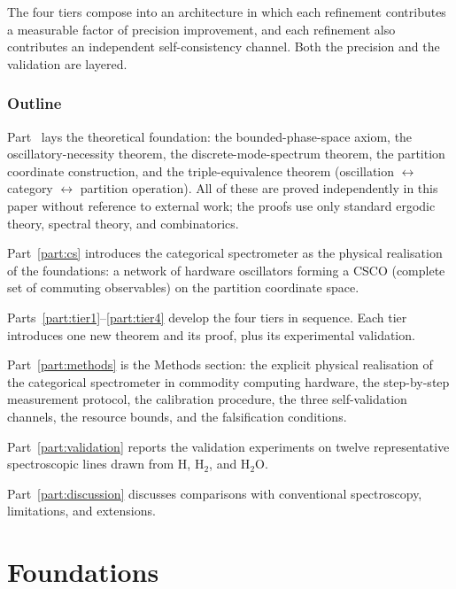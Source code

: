 \documentclass[twocolumn,11pt,a4paper]{article}
\theoremstyle{thmstyle}
\theoremstyle{axiomstyle}
\theoremstyle{definition}
\theoremstyle{remark}
\begin{document}
The four tiers compose into an architecture in which each refinement contributes a measurable factor of precision improvement, and each refinement also contributes an independent self-consistency channel. Both the precision and the validation are layered.

\section{Outline}
\label{sec:outline}

Part~\ref{part:foundations} lays the theoretical foundation: the bounded-phase-space axiom, the oscillatory-necessity theorem, the discrete-mode-spectrum theorem, the partition coordinate construction, and the triple-equivalence theorem (oscillation $\leftrightarrow$ category $\leftrightarrow$ partition operation). All of these are proved independently in this paper without reference to external work; the proofs use only standard ergodic theory, spectral theory, and combinatorics.

Part~\ref{part:cs} introduces the categorical spectrometer as the physical realisation of the foundations: a network of hardware oscillators forming a CSCO (complete set of commuting observables) on the partition coordinate space.

Parts~\ref{part:tier1}--\ref{part:tier4} develop the four tiers in sequence. Each tier introduces one new theorem and its proof, plus its experimental validation.

Part~\ref{part:methods} is the Methods section: the explicit physical realisation of the categorical spectrometer in commodity computing hardware, the step-by-step measurement protocol, the calibration procedure, the three self-validation channels, the resource bounds, and the falsification conditions.

Part~\ref{part:validation} reports the validation experiments on twelve representative spectroscopic lines drawn from H, H$_{2}$, and H$_{2}$O.

Part~\ref{part:discussion} discusses comparisons with conventional spectroscopy, limitations, and extensions.



\part{Foundations}
\label{part:foundations}
\end{document}
